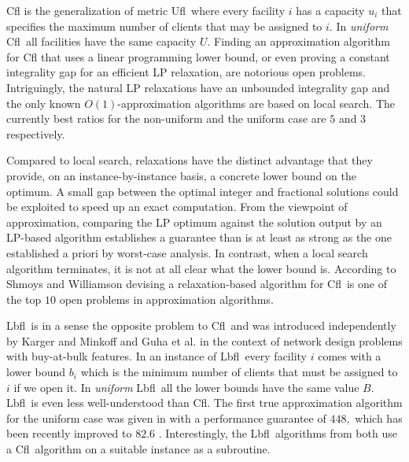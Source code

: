 \documentclass[11pt]{article}\usepackage{amsmath}
\newcommand{\lbfl}{{\sc Lbfl}}
\newcommand{\cfl}{{\sc Cfl}}
\newcommand{\ufl}{{\sc Ufl}}
\begin{document}
\cfl\/ is the  generalization of metric \ufl\ where every facility $i$ has a
capacity $u_i$  that specifies  the maximum number of clients that may
be
assigned to $i.$ In {\em uniform} \cfl\ all facilities have
the same capacity $U.$  
  Finding an approximation algorithm for  \cfl\/ that uses a linear programming
lower bound, or even proving a constant integrality gap for an
efficient  LP
relaxation, are notorious open problems. Intriguingly, 
the  natural LP relaxations  have 
an unbounded integrality gap and
the only known  $O(1)$-approximation algorithms are
based on local search.  The currently best ratios 
for the non-uniform  and the uniform case are $5$ \cite{BansalGG12} and $3$  
\cite{AggarwalLBGGJ12} respectively. 
\iffalse ----------------
Approximation algorithms that use LP
lower bounds are known for 
 the {\em soft capacitated} \cfl\  where multiple copies of a facility
may be opened \cite{ShmoysTA97}  
and   the special case 
where all  facilities have  equal opening cost \cite{LeviSS12}. 
-------- \fi 
Compared to local search, relaxations have 
the distinct advantage that they provide, on an instance-by-instance basis,
a  concrete  lower
bound on the optimum. A small  gap between the
optimal integer and fractional solutions  could be exploited
to speed up an exact  computation. From the viewpoint of
approximation, 
comparing the LP optimum against the  solution  output by an
LP-based algorithm establishes 
a  guarantee than is at least as strong as the one established  a priori by  worst-case
analysis.
In contrast, when a  local search algorithm terminates, 
it is not at all clear what the lower
bound is. 
According to Shmoys and Williamson \cite{ShmoysWbook} devising 
a relaxation-based algorithm for \cfl\  is one of
the top $10$ open problems in approximation algorithms. 



 \lbfl\ is in a sense the opposite problem to \cfl\ and 
was introduced independently by Karger and Minkoff \cite{KargerM00} and Guha et
al. \cite{GuhaMM00} in the context of network design problems with buy-at-bulk
features.  In an instance of \lbfl\ every facility $i$ comes with a  lower
bound $b_i$ 
which is the minimum number of clients that must be assigned
 to $i$  if we open it. In {\em uniform} \lbfl\ all the lower bounds
have the same value $B.$  \lbfl\ is even less well-understood than \cfl. 
The first true approximation algorithm for the uniform case 
was given in \cite{Svitkina08} with a performance guarantee of
$448,$ which has been recently improved  to $82.6 $ \cite{AhmadianS12}. 
Interestingly, the \lbfl\ algorithms
from \cite{Svitkina08,AhmadianS12}  both use a \cfl\ algorithm on a
suitable instance as a subroutine. 
\end{document}
